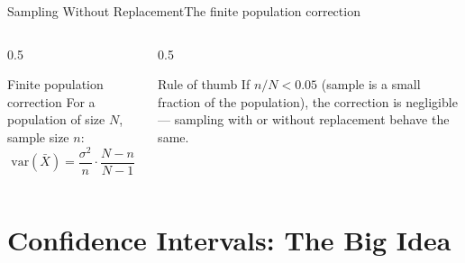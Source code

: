 \documentclass[aspectratio=169,11pt]{beamer}
\begin{document}
\begin{frame}{Sampling Without Replacement}{The finite population correction}
  \begin{columns}[T]
    \begin{column}{0.5\textwidth}
      \begin{block}{Finite population correction}
        \small For a population of size $N$, sample size $n$:
        \[ \text{var}(\bar X) = \frac{\sigma^2}{n}\cdot\frac{N-n}{N-1} \]
      \end{block}
    \end{column}
    \begin{column}{0.5\textwidth}
      \begin{exampleblock}{Rule of thumb}
        \small If $n/N < 0.05$ (sample is a small fraction of the
        population), the correction is negligible — sampling with or
        without replacement behave the same.
      \end{exampleblock}
    \end{column}
  \end{columns}
\end{frame}

\section{Confidence Intervals: The Big Idea}
\end{document}
